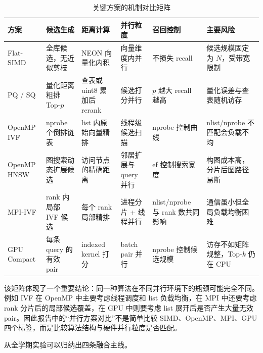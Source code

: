 \documentclass[a4paper]{article}
\begin{document}
\begin{table}[H]
\centering
\scriptsize
\caption{关键方案的机制对比矩阵}
\label{tab:mechanism-matrix}
\begin{tabularx}{\textwidth}{lXXXXX}
\toprule
方案 & 候选生成 & 距离计算 & 并行粒度 & 召回控制 & 主要风险 \\
\midrule
Flat-SIMD & 全库候选，无近似剪枝 & NEON 向量化内积 & 向量维度内并行 & 不损失 recall & 候选规模固定为 $N$，受带宽限制 \\
PQ / SQ & 量化距离粗排 Top-$p$ & 查表或 uint8 累加后 rerank & 候选打分并行 & $p$ 越大 recall 越高 & 量化误差与查表随机访存 \\
OpenMP IVF & nprobe 个倒排链表 & list 内原始向量精排 & 线程级候选扫描 & nprobe 控制曲线 & nlist/nprobe 不匹配会负载不均 \\
OpenMP HNSW & 图搜索动态扩展候选 & 访问节点的精确距离 & 邻居扩展与 query 并行 & ef 控制搜索宽度 & 构图成本高，分片后图路径易断 \\
MPI-IVF & rank 内局部 IVF 候选 & 每个 rank 局部精排 & 进程分片 + 线程并行 & nlist/nprobe 与 rank 数共同影响 & 通信虽小但全局负载均衡困难 \\
GPU Compact & 每条 query 的有效 pair & indexed kernel 打分 & batch pair 并行 & nprobe 控制候选规模 & 访存不如矩阵规整，Top-$k$ 仍在 CPU \\
\bottomrule
\end{tabularx}
\end{table}

该矩阵体现了一个重要结论：同一种算法在不同并行环境下的瓶颈可能完全不同。例如 IVF 在 OpenMP 中主要考虑线程调度和 list 负载均衡，在 MPI 中还要考虑 rank 分片后的局部候选覆盖，在 GPU 中则要考虑 list 展开后是否产生大量无效 pair。因此报告中的“并行方案对比”不是简单比较 SIMD、OpenMP、MPI、GPU 四个标签，而是比较算法结构与硬件并行粒度是否匹配。

从全学期实验可以归纳出四条融合主线。
\end{document}
